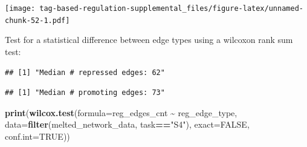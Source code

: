 \documentclass[
]{book}
\newenvironment{Shaded}{\begin{snugshade}}{\end{snugshade}}
\newcommand{\DataTypeTok}[1]{\textcolor[rgb]{0.13,0.29,0.53}{#1}}
\newcommand{\KeywordTok}[1]{\textcolor[rgb]{0.13,0.29,0.53}{\textbf{#1}}}
\newcommand{\NormalTok}[1]{#1}
\newcommand{\OperatorTok}[1]{\textcolor[rgb]{0.81,0.36,0.00}{\textbf{#1}}}
\newcommand{\OtherTok}[1]{\textcolor[rgb]{0.56,0.35,0.01}{#1}}
\newcommand{\StringTok}[1]{\textcolor[rgb]{0.31,0.60,0.02}{#1}}
\begin{document}
\texttt{[image: tag-based-regulation-supplemental\_files/figure-latex/unnamed-chunk-52-1.pdf]}

Test for a statistical difference between edge types using a wilcoxon rank sum test:

\begin{Shaded}
\end{Shaded}

\begin{verbatim}
## [1] "Median # repressed edges: 62"
\end{verbatim}

\begin{Shaded}
\end{Shaded}

\begin{verbatim}
## [1] "Median # promoting edges: 73"
\end{verbatim}

\begin{Shaded}
\begin{Highlighting}[]
\KeywordTok{print}\NormalTok{(}\KeywordTok{wilcox.test}\NormalTok{(}\DataTypeTok{formula=}\NormalTok{reg\_edges\_cnt }\OperatorTok{\textasciitilde{}}\StringTok{ }\NormalTok{reg\_edge\_type, }\DataTypeTok{data=}\KeywordTok{filter}\NormalTok{(melted\_network\_data, task}\OperatorTok{==}\StringTok{"S4"}\NormalTok{), }\DataTypeTok{exact=}\OtherTok{FALSE}\NormalTok{, }\DataTypeTok{conf.int=}\OtherTok{TRUE}\NormalTok{))}
\end{Highlighting}
\end{Shaded}
\end{document}
